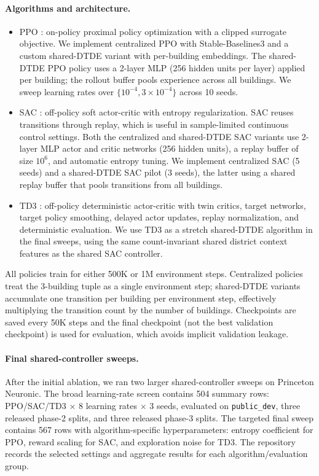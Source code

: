 \documentclass{article}
\begin{document}
\paragraph{Algorithms and architecture.}
\begin{itemize}
    \item PPO \citep{schulman2017proximal}: on-policy proximal policy optimization with a clipped surrogate objective. We implement centralized PPO with Stable-Baselines3 \citep{raffin2021stable} and a custom shared-DTDE variant with per-building embeddings. The shared-DTDE PPO policy uses a 2-layer MLP (256 hidden units per layer) applied per building; the rollout buffer pools experience across all buildings. We sweep learning rates over $\{10^{-4}, 3\times10^{-4}\}$ across 10 seeds.
    \item SAC \citep{haarnoja2018soft}: off-policy soft actor-critic with entropy regularization. SAC reuses transitions through replay, which is useful in sample-limited continuous control settings. Both the centralized and shared-DTDE SAC variants use 2-layer MLP actor and critic networks (256 hidden units), a replay buffer of size $10^6$, and automatic entropy tuning. We implement centralized SAC (5 seeds) and a shared-DTDE SAC pilot (3 seeds), the latter using a shared replay buffer that pools transitions from all buildings.
    \item TD3 \citep{fujimoto2018addressing}: off-policy deterministic actor-critic with twin critics, target networks, target policy smoothing, delayed actor updates, replay normalization, and deterministic evaluation. We use TD3 as a stretch shared-DTDE algorithm in the final sweeps, using the same count-invariant shared district context features as the shared SAC controller.
\end{itemize}

All policies train for either 500K or 1M environment steps. Centralized policies treat the 3-building tuple as a single environment step; shared-DTDE variants accumulate one transition per building per environment step, effectively multiplying the transition count by the number of buildings. Checkpoints are saved every 50K steps and the final checkpoint (not the best validation checkpoint) is used for evaluation, which avoids implicit validation leakage.

\paragraph{Final shared-controller sweeps.} After the initial ablation, we ran two larger shared-controller sweeps on Princeton Neuronic. The broad learning-rate screen contains 504 summary rows: PPO/SAC/TD3 $\times$ 8 learning rates $\times$ 3 seeds, evaluated on \texttt{public\_dev}, three released phase-2 splits, and three released phase-3 splits. The targeted final sweep contains 567 rows with algorithm-specific hyperparameters: entropy coefficient for PPO, reward scaling for SAC, and exploration noise for TD3. The repository records the selected settings and aggregate results for each algorithm/evaluation group.
\end{document}
